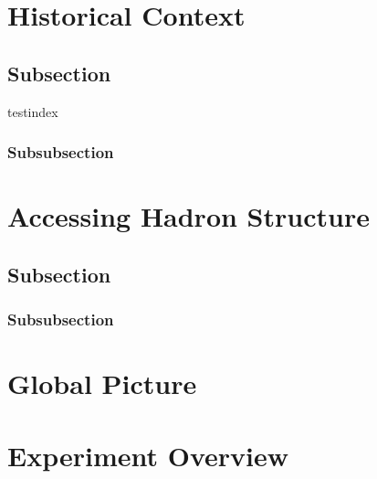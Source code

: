 \label{Chapter-1}

\hypertarget{Section-1.1}{%
\section{Historical Context}\label{Section-1.1}}

\hypertarget{subsection}{%
\subsection{Subsection}\label{subsection}}

testindex  \cite{Zongkerchicken2005}

\hypertarget{subsubsection}{%
\subsubsection{Subsubsection}\label{subsubsection}}

\hypertarget{Section-1.2}{%
\section{Accessing Hadron Structure}\label{Section-1.2}}

\hypertarget{subsection-1}{%
\subsection{Subsection}\label{subsection-1}}

\hypertarget{subsubsection-1}{%
\subsubsection{Subsubsection}\label{subsubsection-1}}

\hypertarget{Section-1.3}{%
\section{Global Picture}\label{Section-1.3}}

\hypertarget{Section-1.4}{%
\section{Experiment Overview}\label{Section-1.4}}


